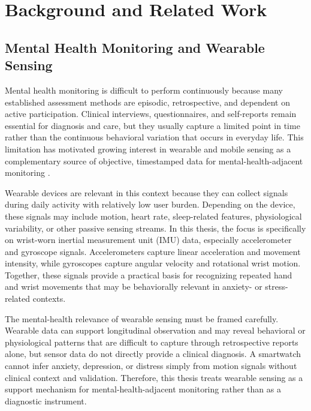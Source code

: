 \chapter{Background and Related Work}
\label{chap:background}

\section{Mental Health Monitoring and Wearable Sensing}

Mental health monitoring is difficult to perform continuously because many established assessment methods are episodic, retrospective, and dependent on active participation. Clinical interviews, questionnaires, and self-reports remain essential for diagnosis and care, but they usually capture a limited point in time rather than the continuous behavioral variation that occurs in everyday life. This limitation has motivated growing interest in wearable and mobile sensing as a complementary source of objective, timestamped data for mental-health-adjacent monitoring \cite{abdalrazaq2023wearable,gomes2023mentalhealth,levine2020passivesensing,lago2024longitudinal}.

Wearable devices are relevant in this context because they can collect signals during daily activity with relatively low user burden. Depending on the device, these signals may include motion, heart rate, sleep-related features, physiological variability, or other passive sensing streams. In this thesis, the focus is specifically on wrist-worn inertial measurement unit (IMU) data, especially accelerometer and gyroscope signals. Accelerometers capture linear acceleration and movement intensity, while gyroscopes capture angular velocity and rotational wrist motion. Together, these signals provide a practical basis for recognizing repeated hand and wrist movements that may be behaviorally relevant in anxiety- or stress-related contexts.

The mental-health relevance of wearable sensing must be framed carefully. Wearable data can support longitudinal observation and may reveal behavioral or physiological patterns that are difficult to capture through retrospective reports alone, but sensor data do not directly provide a clinical diagnosis. A smartwatch cannot infer anxiety, depression, or distress simply from motion signals without clinical context and validation. Therefore, this thesis treats wearable sensing as a support mechanism for mental-health-adjacent monitoring rather than as a diagnostic instrument.

